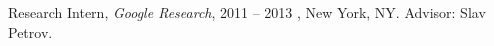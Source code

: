 \documentclass[10pt]{article}
\begin{document}
% 
% 

% 
% 

% 
% 

% 
% 

% 

% 

% 

% 

% 

% 

% 

% 

% 

% 

% 

% 

% 

% 

% 

% 

% 

% 

% 


 \bigskip






\bigskip

\ind Research Intern, {\sl Google Research}, 2011 -- 2013 , New York, NY.  Advisor: Slav Petrov.
\end{document}
